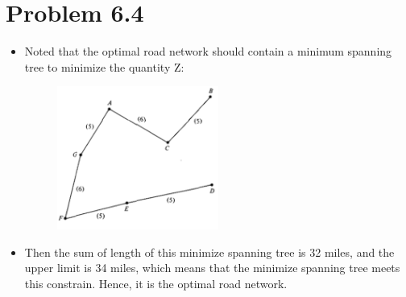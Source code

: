 \documentclass{article}
\theoremstyle{definition}
\theoremstyle{definition}
\theoremstyle{remark}
\begin{document}
\section*{Problem 6.4}
\begin{itemize}
	\item Noted that the optimal road network should contain a minimum 
	spanning tree to minimize the quantity Z:\\
	\begin{figure}[H] %
		\centering %
		\includegraphics[width=0.5\textwidth]{3.png} %
	\end{figure}
	\item Then the sum of length of this minimize spanning tree is 32 miles, 
	and the upper limit is 34 miles, which means that the minimize 
	spanning tree meets this constrain. Hence, it is the optimal 
	road network.
\end{itemize}
\end{document}
